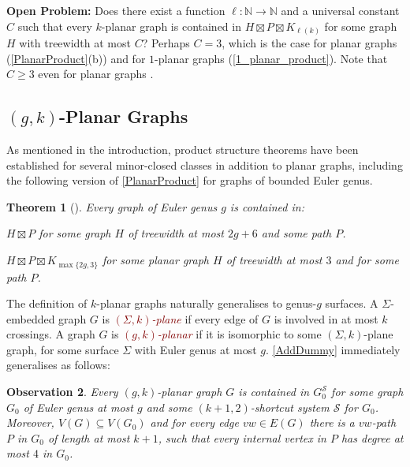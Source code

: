\documentclass{patmorin}
\theoremstyle{plain}
\newtheorem{thm}{Theorem}
\newtheorem{obs}[thm]{Observation}
\theoremstyle{definition}
\newcommand{\defin}[1]{\textcolor{Maroon}{\emph{#1}}}
\renewcommand{\SS}{\mathcal{S}}
\renewcommand{\geq}{\geqslant}
\newcommand{\N}{\mathbb{N}}
\begin{document}
\noindent\textbf{Open Problem:}
  Does there exist a function $\ell:\N\to\N$ and a universal constant $C$ such that every $k$-planar graph is contained in $H\boxtimes P \boxtimes K_{\ell(k)}$ for some graph $H$ with treewidth at most $C$?  Perhaps $C=3$, which is the case for planar graphs (\cref{PlanarProduct}(b)) and for $1$-planar graphs (\cref{1_planar_product}). Note that $C\geq 3$ even for planar graphs \citep{DJMMUW20}.

\subsection{\boldmath $(g,k)$-Planar Graphs}
\label{gk_planar_section}

As mentioned in the introduction, product structure theorems have been established for several minor-closed classes in addition to planar graphs, including the following version of \cref{PlanarProduct} for graphs of bounded Euler genus.

\begin{thm}[\citep{DJMMUW20,UWY22,DHHW22}]\label{GenusProduct}
  Every graph of Euler genus $g$ is contained in:
  \begin{compactenum}[(a)]
  \item $H  \boxtimes P$ for some graph $H$ of treewidth at most $2g+6$  and some path $P$.
  \item $H \boxtimes P \boxtimes K_{\max\{2g,3\}}$ for some planar graph $H$ of treewidth at most $3$ and for some path $P$.
  \end{compactenum}
\end{thm}

The definition of $k$-planar graphs naturally generalises to genus-$g$ surfaces. A $\Sigma$-embedded graph $G$ is \defin{$(\Sigma,k)$-plane} if every edge of $G$ is involved in at most $k$ crossings.  A graph $G$ is \defin{$(g,k)$-planar} if it is isomorphic to some $(\Sigma,k)$-plane graph, for some surface $\Sigma$ with Euler genus at most $g$. \cref{AddDummy} immediately generalises as follows:

\begin{obs}
\label{gAddDummy}
Every $(g,k)$-planar graph $G$ is contained in $G_0^\SS$ for some graph $G_0$ of Euler genus at most $g$ and some $(k+1,2)$-shortcut system $\SS$ for $G_0$. Moreover, $V(G) \subseteq V(G_0)$ and for every edge $vw \in E(G)$ there is a $vw$-path $P$ in $G_0$ of length at most $k+1$, such that every internal vertex in $P$ has degree at most $4$ in $G_0$.
\end{obs}
\end{document}
